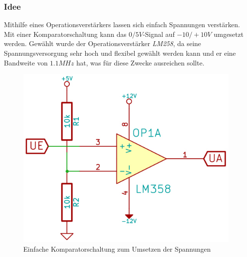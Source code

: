 \subsubsection{Idee} %
Mithilfe eines Operationsverstärkers lassen sich einfach Spannungen verstärken. Mit einer Komparatorschaltung kann das $0/5V$-Signal auf $-10/+10V$ umgesetzt werden. Gewählt wurde der Operationsverstärker \textit{LM258}, da seine Spannungsversorgung sehr hoch und flexibel gewählt werden kann und er eine Bandweite von $1.1MHz$ hat, was für diese Zwecke ausreichen sollte.
\begin{figure}[H]
\centering
\includegraphics[scale=0.5]{images/komparatorschaltung.jpg}
\caption{Einfache Komparatorschaltung zum Umsetzen der Spannungen} \label{img:I1} %
\end{figure}


